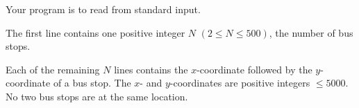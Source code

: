 Your program is to read from standard input. 

The first line contains one positive integer $N$ $(2 \le N \le 500)$, the number of bus stops. 

Each of the remaining $N$ lines contains the $x$-coordinate followed by the $y$-coordinate of a bus stop.
The $x$- and $y$-coordinates are positive integers $\le 5000$.
No two bus stops are at the same location.